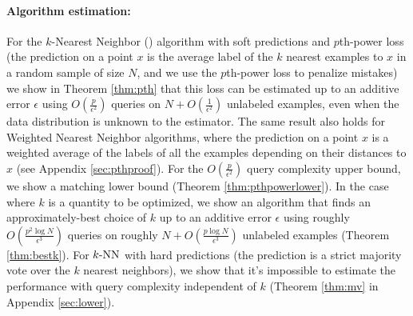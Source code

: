 \paragraph{Algorithm estimation:}
For the $k$-Nearest Neighbor (\knn) algorithm with soft predictions and $p$th-power loss (the prediction on a point $x$ is the average label of the $k$ nearest examples to $x$ in a random sample of size $N$, and we use the $p$th-power loss to penalize mistakes) we show in Theorem \ref{thm:pth} that this loss can be estimated up to an additive error $\epsilon$ using $O(\frac{p}{\epsilon^2})$ queries on $N+O(\frac{1}{\epsilon^2})$ unlabeled examples, even when the data distribution is unknown to the estimator. The same result also holds for Weighted Nearest Neighbor algorithms, where the prediction on a point $x$ is a weighted average of the labels of all the examples depending on their distances to $x$ (see Appendix \ref{sec:pthproof}). For the $O(\frac{p}{\epsilon^2})$ query complexity upper bound, we show a matching lower bound (Theorem \ref{thm:pthpowerlower}). In the case where $k$ is a quantity to be optimized, we show an algorithm that finds an approximately-best choice of $k$ up to an additive error $\epsilon$ using roughly 
$O(\frac{p^2\log N}{\epsilon^3})$ queries on roughly $N+O(\frac{p\log N}{\epsilon^3})$ unlabeled examples (Theorem \ref{thm:bestk}).  For ${\text{$k$-NN}}$ with hard predictions (the prediction is a strict majority vote over the $k$ nearest neighbors), we show that it's impossible to estimate the performance with query complexity independent of $k$
(Theorem \ref{thm:mv} in Appendix \ref{sec:lower}).%


